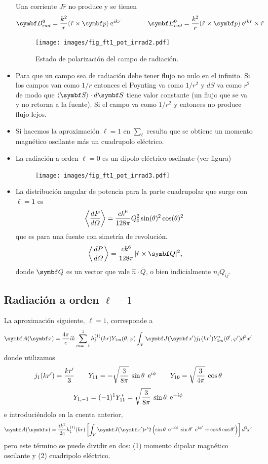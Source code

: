 \documentclass[10pt,oneside]{CBFT_book}
\begin{document}
\begin{itemize}
 Una corriente $J\hat{r}$ no produce  y se tienen
 \[
	\vb{B}^0_{rad} = \frac{k^2}{r}( \hat{r} \times \vb{p} ) \euler^{ikr} \qquad \qquad 
	\vb{E}^0_{rad} = \frac{k^2}{r}( \hat{r} \times \vb{p} ) \euler^{ikr} \times \hat{r}
 \]
	\begin{figure}[htb]
		\begin{center}
		\texttt{[image: images/fig\_ft1\_pot\_irrad2.pdf]}	 
		\end{center}
		\caption{Estado de polarización del campo de radiación.}
	\end{figure} 
 \item Para que un campo sea de radiación debe tener flujo  no nulo en el infinito.
 Si los campos van como $1/r$ entonces el Poynting va como $1/r^2$ y $dS$ va como $r^2$
 de modo que $\langle\vb{S}\rangle \cdot d\vb{S}$ tiene valor constante (un flujo que se
 va y no retorna a la fuente). Si el campo va como $1/r^2$ y entonces no produce flujo
 lejos.
 \item Si hacemos la aproximación $\ell=1$ en $\sum_\ell$ resulta que se obtiene un momento
 magnético oscilante más un cuadrupolo eléctrico.
 \item La radiación a orden $\ell=0$ es un dipolo eléctrico oscilante (ver figura)
	\begin{figure}[htb]
		\begin{center}
		\texttt{[image: images/fig\_ft1\_pot\_irrad3.pdf]}	 
		\end{center}
		\caption{}
	\end{figure} 
 \item La distribución angular de potencia para la parte cuadrupolar que surge con $\ell=1$ es
	\[
		\left\langle\frac{d^{\hspace{-0.05em}} {P}}{d {\Omega}^{\hspace{-0.05em}}}\right\rangle = \frac{ck^6}{128\pi} Q_0^2 \sin(\theta)^2 
\cos(\theta)^2
	\]
	que es para una fuente con simetría de revolución.
	\[
		\vm{ \dtot{P}{\Omega} } = \frac{ck^6}{128\pi} |\hat{r} \times \vb{Q} |^2, 
	\]
	donde $\vb{Q}$ es un vector que vale $\hat{n} \cdot \overline{Q}$, o bien indicialmente $n_iQ_{ij}$.
\end{itemize}

\subsection{Radiación a orden $\ell=1$}

La aproximación siguiente, $\ell=1$, corresponde a
\[
	\vb{A}(\vbx) = \frac{4\pi}{c} i k \sum_{m=-1}^{1}
	h^{(1)}_\ell(kr) Y_{1 m}(\theta,\vp)
	\int_V \vb{J}(\vbx') j_1(kr') Y_{1 m}^*(\theta',\vp') d^3x' 
\]
donde utilizamos
\[
	j_1(kr') = \frac{kr'}{3} \qquad 
	Y_{11} = - \sqrt{ \frac{3}{8\pi} } \: \sin\theta \: \:\mathrm{e}^{i \phi} \qquad 
	Y_{10} = \sqrt{ \frac{3}{4\pi} } \: \cos\theta 
\]
\[
	Y_{1,-1} = (-1)^{1} Y_{11}^* = \sqrt{ \frac{3}{8\pi} } \: \sin\theta \: \:\mathrm{e}^{-i \phi} 
\]
e introduciéndolo en la cuenta anterior,
\[
	\vb{A}(\vbx) = \frac{ i k^2 }{ 2 c } h^{(1)}_1(kr) \left[ 
	 \int_V \vb{J}(\vbx') r' 2 \left( \sin\theta \: \euler^{-i \phi} \: \sin\theta'\:\euler^{i\phi'} +
	\cos\theta\cos\theta' \right) \right] d^3x'  
\]
pero este término se puede dividir en dos: (1) momento dipolar magnético oscilante y (2) cuadripolo
eléctrico.
\end{document}
